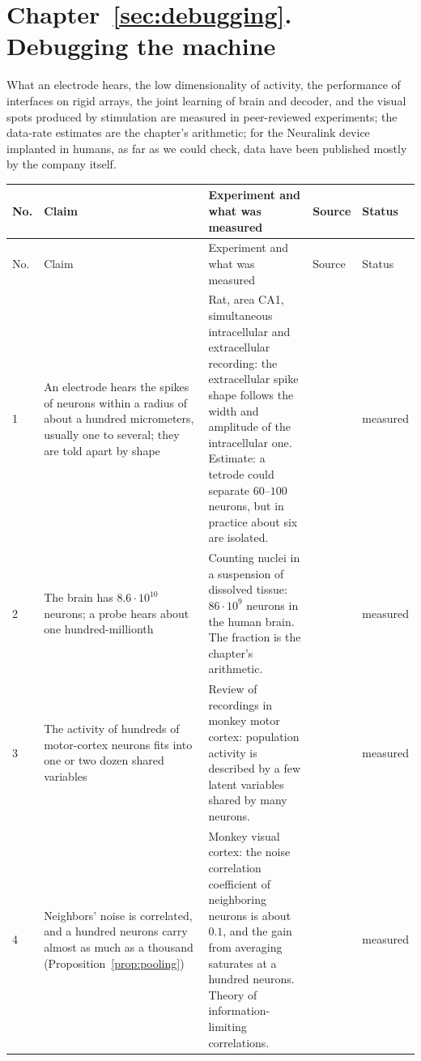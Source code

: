\section{Chapter~\ref{sec:debugging}. Debugging the machine}

What an electrode hears, the low dimensionality of activity, the performance of interfaces on rigid arrays, the joint learning of brain and decoder, and the visual spots produced by stimulation are measured in peer-reviewed experiments; the data-rate estimates are the chapter's arithmetic; for the Neuralink device implanted in humans, as far as we could check, data have been published mostly by the company itself.

{\footnotesize
\setlength{\tabcolsep}{3pt}\renewcommand{\arraystretch}{1.15}
\begin{longtable}{>{\raggedright}p{0.5cm}>{\raggedright}p{4.0cm}>{\raggedright}p{5.6cm}>{\raggedright}p{2.3cm}>{\raggedright\arraybackslash}p{1.7cm}}
\toprule
No. & Claim & Experiment and what was measured & Source & Status \\
\midrule\endfirsthead
\toprule
No. & Claim & Experiment and what was measured & Source & Status \\
\midrule\endhead
1 & An electrode hears the spikes of neurons within a radius of about a hundred micrometers, usually one to several; they are told apart by shape & Rat, area CA1, simultaneous intracellular and extracellular recording: the extracellular spike shape follows the width and amplitude of the intracellular one. Estimate: a tetrode could separate $60$--$100$ neurons, but in practice about six are isolated. & \cite{Henze2000extra} & measured \\
2 & The brain has $8.6\cdot10^{10}$ neurons; a probe hears about one hundred-millionth & Counting nuclei in a suspension of dissolved tissue: $86\cdot10^9$ neurons in the human brain. The fraction is the chapter's arithmetic. & \cite{Azevedo2009} & measured \\
3 & The activity of hundreds of motor-cortex neurons fits into one or two dozen shared variables & Review of recordings in monkey motor cortex: population activity is described by a few latent variables shared by many neurons. & \cite{Gallego2017} & measured \\
4 & Neighbors' noise is correlated, and a hundred neurons carry almost as much as a thousand (Proposition~\ref{prop:pooling}) & Monkey visual cortex: the noise correlation coefficient of neighboring neurons is about $0.1$, and the gain from averaging saturates at a hundred neurons. Theory of information-limiting correlations. & \cite{Zohary1994, MorenoBote2014} & measured \\

\end{longtable}}
